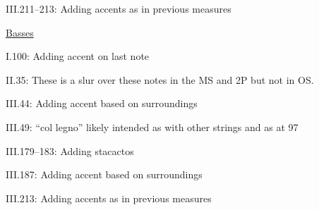 \documentclass[twoside]{article}
\begin{document}
\begin{hangparas}{15pt}{1}
\begin{multicols}{2}
III.211--213: Adding accents as in previous measures

\underline{Basses}

I.100: Adding accent on last note

II.35: These is a slur over these notes in the MS and 2P but not in OS.

III.44: Adding accent based on surroundings

III.49: ``col legno'' likely intended as with other strings and as at 97

III.179--183: Adding stacactos

III.187: Adding accent based on surroundings

III.213: Adding accents as in previous measures

\end{multicols}

\end{hangparas}
\end{document}
